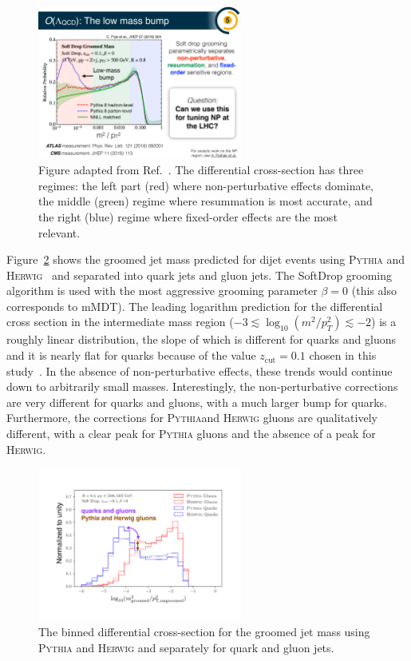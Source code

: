 \documentclass[11pt]{cernrep}
\begin{document}
\begin{figure}[h!]
\centering
\includegraphics[width=0.6\textwidth]{figs/Lowmassbump.pdf}
\caption{Figure adapted from Ref.~\cite{Frye:2016aiz}.  The differential cross-section has three regimes: the left part (red) where non-perturbative effects dominate, the middle (green) regime where resummation is most accurate, and the right (blue) regime where fixed-order effects are the most relevant.}
\label{fig:jets:np:illustration}
\end{figure}

Figure~\ref{fig:jets:np:qg} shows the groomed jet mass predicted for dijet events using \textsc{Pythia} and \textsc{Herwig}~\cite{Bahr:2008pv,Bellm:2015jjp,Bellm:2019zci} and separated into quark jets and gluon jets.  The SoftDrop grooming algorithm is used with the most aggressive grooming parameter $\beta=0$ (this also corresponds to mMDT).  The leading logarithm prediction for the differential cross section in the intermediate mass region ($-3\lesssim\log_{10}(m^2/p_T^2)\lesssim -2$) is a roughly linear distribution, the slope of which is different for quarks and gluons and it is nearly flat for quarks because of the value $z_\text{cut}=0.1$ chosen in this study~\cite{Dasgupta:2013ihk}. In the absence of non-perturbative effects, these trends would continue down to arbitrarily small masses. Interestingly, the non-perturbative corrections are very different for quarks and gluons, with a much larger bump for quarks.  Furthermore, the corrections for \textsc{Pythia}and \textsc{Herwig} gluons are qualitatively different, with a clear peak for \textsc{Pythia} gluons and the absence of a peak for \textsc{Herwig}.

\begin{figure}[h!]
\centering
\includegraphics[width=0.6\textwidth]{figs/NPbumpvariations.pdf}
\caption{The binned differential cross-section for the groomed jet mass using \textsc{Pythia} and \textsc{Herwig} and separately for quark and gluon jets.}
\label{fig:jets:np:qg}
\end{figure}
\end{document}
